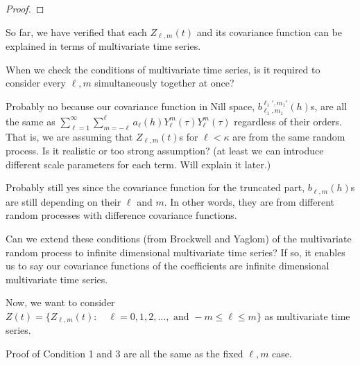 \documentclass[11pt]{article}
\begin{document}
\begin{itemize}
\begin{proof}
\end{proof}

\pagebreak
\item
So far, we have verified that each $Z_{\ell,m}(t)$ and its covariance function can be explained in terms of multivariate time series.\\

\item
{\color{red}
When we check the conditions of multivariate time series, is it required to consider every $\ell, m$ simultaneously together at once?\\ 

\item 
Probably no because our covariance function in Nill space, $b_{\ell_1,m_1}^{\ell_1',m_1'}(h)$s, are all the same as $\sum_{\ell=1}^{\infty} \sum_{m=-\ell}^{\ell} a_{\ell}(h) Y_{\ell}^{m}(\tau) Y_{\ell}^{m}(\tau)$ regardless of their orders. That is, we are assuming that $Z_{\ell,m}(t)$s for $\ell<\kappa$ are from the same random process. Is it realistic or too strong assumption? (at least we can introduce different scale parameters for each term. Will explain it later.) 

\item
Probably still yes since the covariance function for the truncated part, $b_{\ell,m}(h)$s are still depending on their $\ell$ and $m$. In other words, they are from different random processes with difference covariance functions.\\

\item 
Can we extend these conditions (from Brockwell and Yaglom) of the multivariate random process to infinite dimensional multivariate time series? If so, it enables us to say our covariance functions of the coefficients are infinite dimensional multivariate time series.\\
}

\pagebreak

\item
Now, we want to consider $Z(t) = \{Z_{\ell,m}(t): \quad \ell=0,1,2,..., \text{ and } -m \le \ell \le m \}$ as multivariate time series.\\

\item
Proof of Condition 1 and 3 are all the same as the fixed $\ell,m$ case.\\


\end{itemize}
\end{document}
